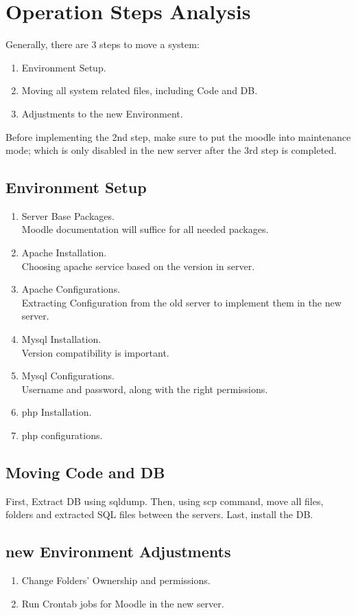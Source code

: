 \section*{Operation Steps Analysis}

Generally, there are 3 steps to move a system:

\begin{enumerate}
    \item Environment Setup.
    \item Moving all system related files, including Code and DB.
    \item Adjustments to the new Environment.
\end{enumerate}
Before implementing the 2nd step, make sure to put the moodle into maintenance mode; which is only disabled in the new server after the 3rd step is completed.

\subsection*{Environment Setup}

\begin{enumerate}
    \item Server Base Packages.
    \\Moodle documentation will suffice for all needed packages.
    \item Apache Installation.
    \\Choosing apache service based on the version in server.
    \item Apache Configurations.
    \\Extracting Configuration from the old server to implement them in the new server.
    \item Mysql Installation.
    \\Version compatibility is important. 
    \item Mysql Configurations.
    \\Username and password, along with the right permissions.
    \item php Installation.
    \item php configurations.
\end{enumerate}

\subsection*{Moving Code and DB}
First, Extract DB using sqldump.
Then, using scp command, move all files, folders and extracted SQL files between the servers.
Last, install the DB.

\subsection*{new Environment Adjustments}
\begin{enumerate}
    \item Change Folders' Ownership and permissions.
    \item Run Crontab jobs for Moodle in the new server.
\end{enumerate}
